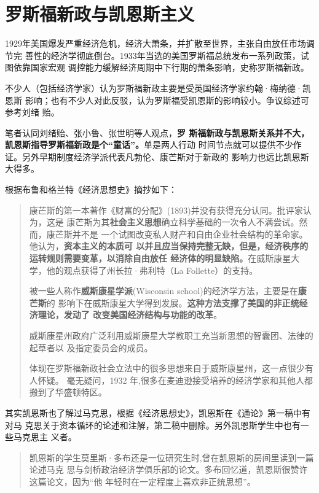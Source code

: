 \chapter{罗斯福新政与凯恩斯主义}


1929年美国爆发严重经济危机，经济大萧条，并扩散至世界，主张自由放任市场调节完
善性的经济学彻底倒台。1933年当选的美国罗斯福总统发布一系列政策，试图依靠国家宏观
调控能力缓解经济周期中下行期的萧条影响，史称罗斯福新政。

不少人（包括经济学家）认为罗斯福新政主要是受英国经济学家约翰·梅纳德·凯恩斯
影响；也有不少人对此反驳，认为罗斯福受凯恩斯的影响较小。争议综述可参考刘绪
贻\cite{roosevelt}。

笔者认同刘绪贻、张小鲁\cite{bijiao202002}、张世明\cite{JJFX200100010}等人观点，\textbf{罗
  斯福新政与凯恩斯关系并不大，凯恩斯指导罗斯福新政是个“童话”。}单是两人行动
时间节点就可以提供不少作证。另外早期制度经济学派代表凡勃伦、康芒斯对于新政的
影响力也远比凯恩斯大得多。

根据布鲁和格兰特《经济思想史》摘抄如下：
\begin{quotation}
  康芒斯的第一本著作《财富的分配》(1893)并没有获得充分认同。批评家认为，这是
  康芒斯为其\textbf{社会主义思想}确立科学基础的一次令人不满尝试。然而，康芒斯并不是
  一个试图改变私人财产和自由企业社会结构的革命家。他认为，\textbf{资本主义的本质可
    以并且应当保持完整无缺，但是，经济秩序的运转规则需要变革，以消除自由放任
    经济体的明显缺陷。}在威斯康星大学，他的观点获得了州长拉·弗利特（La
  Follette）的支持。

  被一些人称作\textbf{威斯康星学派}(Wisconsin school)的经济学方法，主要是在\textbf{康芒斯}的
  影响下在威斯康星大学得到发展。\textbf{这种方法支撑了美国的非正统经济理论，发动了
    改变美国经济结构与功能的改革}。

  威斯康星州政府广泛利用威斯康星大学教职工充当新思想的智囊团、法律的起草者以
  及指定委员会的成员。

  体现在罗斯福新政社会立法中的很多思想来自于威斯康星州，这一点很少有人怀疑。
  毫无疑问，1932 年,很多在麦迪逊接受培养的经济学家和其他人都搬到了华盛顿特区。
\end{quotation}

其实凯恩斯也了解过马克思，根据《经济思想史》，凯恩斯在《通论》第一稿中有对马
克思关于资本循环的论述和注解，第二稿中删除。另外凯恩斯学生中也有一些马克思主
义者。
\begin{quotation}
  凯恩斯的学生莫里斯·多布还是一位研究生时,曾在凯恩斯的房间里读到一篇论述马克
  思与剑桥政治经济学俱乐部的论文。多布回忆道，凯恩斯很赞许这篇论文，因为“他
  年轻时在一定程度上喜欢非正统思想”。
\end{quotation}

